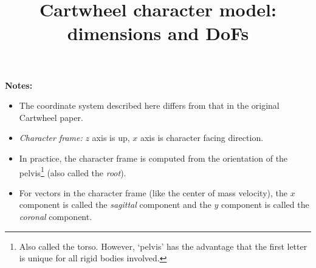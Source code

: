 \documentclass[a4paper]{article}
\title{Cartwheel character model: dimensions and DoFs}
\begin{document}



\pgfmathsetmacro{\shankSizeZ}{\legSizeZ * \kneeRelativePosZ}
\pgfmathsetmacro{\thighSizeZ}{\legSizeZ - \shankSizeZ}

\pgfmathsetmacro{\anklePosZ}{\footSizeZ}
\pgfmathsetmacro{\kneePosZ}{\anklePosZ + \legSizeZ * \kneeRelativePosZ}
\pgfmathsetmacro{\hipPosZ}{\anklePosZ + \legSizeZ}



\maketitle
\textbf{Notes:}
\begin{itemize}
\item The coordinate system described here differs from that in the original Cartwheel paper.
\item \textit{Character frame:} $z$ axis is up, $x$ axis is character facing direction.
\item In practice, the character frame is computed from the orientation of the pelvis\footnote{Also called the torso. However, `pelvis' has the advantage that the first letter is unique for all rigid bodies involved.} (also called the \textit{root}).
\item For vectors in the character frame (like the center of mass velocity), the $x$ component is called the \textit{sagittal} component and the $y$ component is called the \textit{coronal} component.
\end{itemize}
\end{document}

